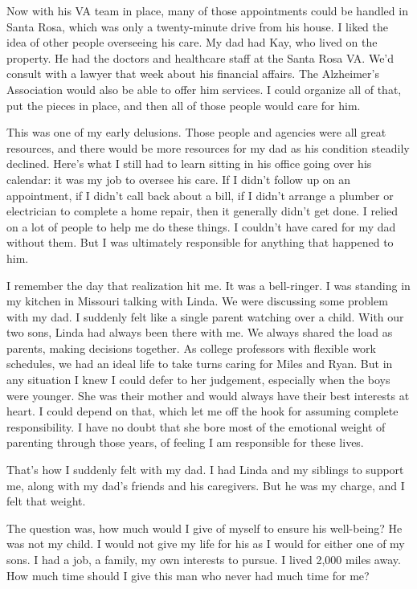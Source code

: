 \documentclass[12pt]{book}
\begin{document}
Now with his VA team in place, many of those appointments could be handled in Santa Rosa, which was only a twenty-minute drive from his house. I liked the idea of other people overseeing his care. My dad had Kay, who lived on the property. He had the doctors and healthcare staff at the Santa Rosa VA. We'd consult with a lawyer that week about his financial affairs. The Alzheimer's Association would also be able to offer him services. I could organize all of that, put the pieces in place, and then all of those people would care for him.

This was one of my early delusions. Those people and agencies were all great resources, and there would be more resources for my dad as his condition steadily declined. Here's what I still had to learn sitting in his office going over his calendar: it was my job to oversee his care. If I didn't follow up on an appointment, if I didn't call back about a bill, if I didn't arrange a plumber or electrician to complete a home repair, then it generally didn't get done. I relied on a lot of people to help me do these things. I couldn't have cared for my dad without them. But I was ultimately responsible for anything that happened to him.

I remember the day that realization hit me. It was a bell-ringer. I was standing in my kitchen in Missouri talking with Linda. We were discussing some problem with my dad. I suddenly felt like a single parent watching over a child. With our two sons, Linda had always been there with me. We always shared the load as parents, making decisions together. As college professors with flexible work schedules, we had an ideal life to take turns caring for Miles and Ryan. But in any situation I knew I could defer to her judgement, especially when the boys were younger. She was their mother and would always have their best interests at heart. I could depend on that, which let me off the hook for assuming complete responsibility. I have no doubt that she bore most of the emotional weight of parenting through those years, of feeling I am responsible for these lives.

That's how I suddenly felt with my dad. I had Linda and my siblings to support me, along with my dad's friends and his caregivers. But he was my charge, and I felt that weight.

The question was, how much would I give of myself to ensure his well-being? He was not my child. I would not give my life for his as I would for either one of my sons. I had a job, a family, my own interests to pursue. I lived 2,000 miles away. How much time should I give this man who never had much time for me?
\end{document}
